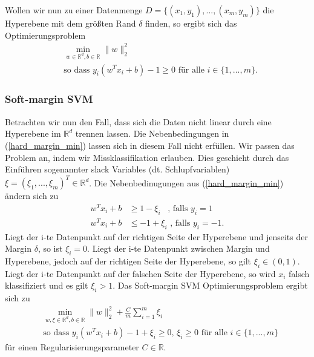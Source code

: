 \documentclass{article}
\theoremstyle{plain}
\theoremstyle{definition}
\begin{document}
    Wollen wir nun zu einer Datenmenge $D = \{ (x_1, y_1), ..., (x_m,y_m)\}$ die Hyperebene mit dem größten Rand $\delta$ finden, so ergibt sich das Optimierungsproblem
    \begin{equation} \label{hard_margin_min}
    \begin{split}
        & \min_{w \in \mathbb{R}^d, b \in \mathbb{R}} \|w\|_{2}^{2} \\
        & \textrm{so dass } y_i(w^T x_i + b ) - 1 \geq 0 \textrm{ für alle } i \in \{1,...,m\}.
    \end{split}
    \end{equation}
    
\subsubsection{Soft-margin SVM}

Betrachten wir nun den Fall, dass sich die Daten nicht linear durch eine Hyperebene im $\mathbb{R}^d$ trennen lassen. Die Nebenbedingungen in (\ref{hard_margin_min}) lassen sich in diesem Fall nicht erfüllen. Wir passen das Problem an, indem wir Missklassifikation erlauben. Dies geschieht durch das Einführen sogenannter slack Variables (dt. Schlupfvariablen) $\xi = (\xi_1,...,\xi_m)^T \in \mathbb{R}^d$. Die Nebenbedinugungen aus  (\ref{hard_margin_min}) ändern sich zu
\begin{equation*}
\begin{split}
    w^T x_i + b & \geq 1 - \xi_i  \enspace \textrm{ , falls } y_i = 1 \\
    w^T x_i + b & \leq - 1 + \xi_i \textrm{ , falls } y_i = -1.
\end{split}
\end{equation*}
Liegt der i-te Datenpunkt auf der richtigen Seite der Hyperebene und jenseits der Margin $\delta$, so ist $\xi_i = 0$.
Liegt der i-te Datenpunkt zwischen Margin und Hyperebene, jedoch auf der richtigen Seite der Hyperebene, so gilt $\xi_i \in (0,1)$. Liegt der i-te Datenpunkt auf der falschen Seite der Hyperebene, so wird $x_i$ falsch klassifiziert und es gilt $\xi_i > 1$.
Das Soft-margin SVM Optimierungsproblem ergibt sich zu 
\begin{equation}\label{eqn:soft_margin_min}
\begin{split}
    & \min_{w, \xi \in \mathbb{R}^d, b \in \mathbb{R}} \|w\|_{2}^{2} + \frac{C}{m} \sum_{i = 1}^{m} \xi_i \\
    & \textrm{so dass } y_i(w^T x_i + b ) - 1 + \xi_i \geq 0, \, \xi_i \geq 0 \textrm{ für alle } i \in \{1,...,m\}
\end{split}
\end{equation}
für einen Regularisierungsparameter $C \in \mathbb{R}$.
\end{document}
